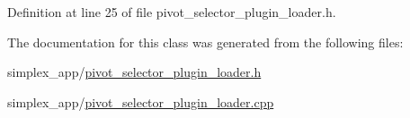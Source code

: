 Definition at line 25 of file pivot\+\_\+selector\+\_\+plugin\+\_\+loader.\+h.



The documentation for this class was generated from the following files\+:\begin{DoxyCompactItemize}
\item 
simplex\+\_\+app/\hyperlink{pivot__selector__plugin__loader_8h}{pivot\+\_\+selector\+\_\+plugin\+\_\+loader.\+h}\item 
simplex\+\_\+app/\hyperlink{pivot__selector__plugin__loader_8cpp}{pivot\+\_\+selector\+\_\+plugin\+\_\+loader.\+cpp}\end{DoxyCompactItemize}

